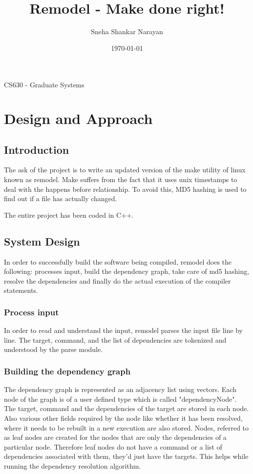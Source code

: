 \documentclass[a4paper, 12pt, notitlepage]{report}
\title{Remodel - Make done right! } %
\author{Sneha Shankar Narayan} %
\date{\today} %
\begin{document}
\maketitle
\begin{center}
CS630 - Graduate Systems
\end{center}
\thispagestyle{empty}
\newpage

\tableofcontents


\chapter{Design and Approach}
%
\section{Introduction}
The ask of the project is to write an updated version of the make utility of linux known as remodel. Make suffers from the fact that it uses unix timestamps to deal with the happens before relationship. To avoid this, MD5 hashing is used to find out if a file has actually changed. 

The entire project has been coded in C++.

\section{System Design}
In order to successfully build the software being compiled, remodel does the following: processes input, build the dependency graph, take care of md5 hashing, resolve the dependencies and finally do the actual execution of the compiler statements.

\subsection{Process input}
In order to read and understand the input, remodel parses the input file line by line. The target, command, and the list of dependencies are tokenized and understood by the parse module.

\subsection{Building the dependency graph}
The dependency graph is represented as an adjacency list using vectors. Each node of the graph is of a user defined type which is called "dependencyNode". The target, command and the dependencies of the target are stored in each node. Also various other fields required by the node like whether it has been resolved, where it needs to be rebuilt in a new execution are also stored. Nodes, referred to as leaf nodes are created for the nodes that are only the dependencies of a particular node. Therefore leaf nodes do not have a command or a list of dependencies associated with them, they'd just have the targets. This helps while running the dependency resolution algorithm.
\end{document}
